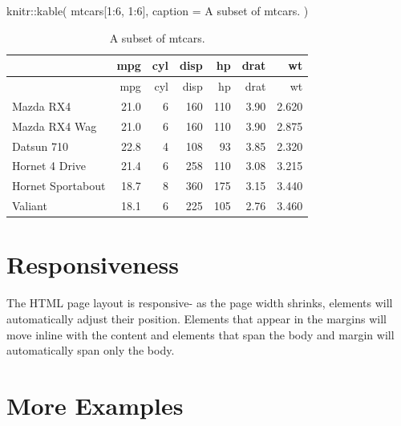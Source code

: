 \documentclass[
  letterpaper,
  DIV=11,
  numbers=noendperiod,
  oneside]{scrartcl}
\newenvironment{Shaded}{\begin{snugshade}}{\end{snugshade}}
\newcommand{\AttributeTok}[1]{\textcolor[rgb]{0.40,0.45,0.13}{#1}}
\newcommand{\DecValTok}[1]{\textcolor[rgb]{0.68,0.00,0.00}{#1}}
\newcommand{\FunctionTok}[1]{\textcolor[rgb]{0.28,0.35,0.67}{#1}}
\newcommand{\NormalTok}[1]{\textcolor[rgb]{0.00,0.23,0.31}{#1}}
\newcommand{\SpecialCharTok}[1]{\textcolor[rgb]{0.37,0.37,0.37}{#1}}
\newcommand{\StringTok}[1]{\textcolor[rgb]{0.13,0.47,0.30}{#1}}
\begin{document}
\begin{Shaded}
\begin{Highlighting}[]
\NormalTok{knitr}\SpecialCharTok{::}\FunctionTok{kable}\NormalTok{(}
\NormalTok{  mtcars[}\DecValTok{1}\SpecialCharTok{:}\DecValTok{6}\NormalTok{, }\DecValTok{1}\SpecialCharTok{:}\DecValTok{6}\NormalTok{], }\AttributeTok{caption =} \StringTok{\textquotesingle{}A subset of mtcars.\textquotesingle{}}
\NormalTok{)}
\end{Highlighting}
\end{Shaded}

{
\makeatletter
\def\LT@makecaption#1#2#3{%
  \noalign{\smash{\hbox{\kern\textwidth\rlap{\kern\marginparsep
  \parbox[t]{\marginparwidth}{%
    \footnotesize{%
      \vspace{(1.1\baselineskip)}
    #1{#2: }\ignorespaces #3}}}}}}%
    }
\makeatother

\begin{longtable}[]{@{}lrrrrrr@{}}
\caption{A subset of mtcars.}\tabularnewline
\toprule()
& mpg & cyl & disp & hp & drat & wt \\
\midrule()
\endfirsthead
\toprule()
& mpg & cyl & disp & hp & drat & wt \\
\midrule()
\endhead
Mazda RX4 & 21.0 & 6 & 160 & 110 & 3.90 & 2.620 \\
Mazda RX4 Wag & 21.0 & 6 & 160 & 110 & 3.90 & 2.875 \\
Datsun 710 & 22.8 & 4 & 108 & 93 & 3.85 & 2.320 \\
Hornet 4 Drive & 21.4 & 6 & 258 & 110 & 3.08 & 3.215 \\
Hornet Sportabout & 18.7 & 8 & 360 & 175 & 3.15 & 3.440 \\
Valiant & 18.1 & 6 & 225 & 105 & 2.76 & 3.460 \\
\bottomrule()
\end{longtable}

}

\hypertarget{responsiveness}{%
\section{Responsiveness}\label{responsiveness}}

The HTML page layout is responsive- as the page width shrinks, elements
will automatically adjust their position. Elements that appear in the
margins will move inline with the content and elements that span the
body and margin will automatically span only the body.

\hypertarget{more-examples}{%
\section{More Examples}\label{more-examples}}
\end{document}
